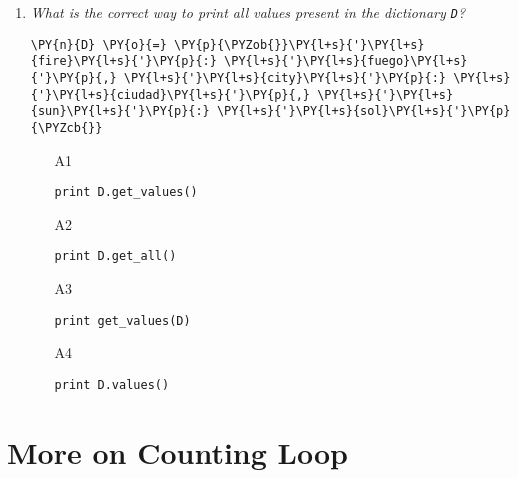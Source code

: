\begin{enumerate}
\vspace{6mm}

\item {\em What is the correct way to print 
all values present in the dictionary {\tt D}?}\\

\begin{Verbatim}[commandchars=\\\{\}]
\PY{n}{D} \PY{o}{=} \PY{p}{\PYZob{}}\PY{l+s}{'}\PY{l+s}{fire}\PY{l+s}{'}\PY{p}{:} \PY{l+s}{'}\PY{l+s}{fuego}\PY{l+s}{'}\PY{p}{,} \PY{l+s}{'}\PY{l+s}{city}\PY{l+s}{'}\PY{p}{:} \PY{l+s}{'}\PY{l+s}{ciudad}\PY{l+s}{'}\PY{p}{,} \PY{l+s}{'}\PY{l+s}{sun}\PY{l+s}{'}\PY{p}{:} \PY{l+s}{'}\PY{l+s}{sol}\PY{l+s}{'}\PY{p}{\PYZcb{}}
\end{Verbatim}
\vspace{6mm}

\begin{enumerate}
\item[A1] 
\begin{verbatim}
print D.get_values()
\end{verbatim}
\item[A2] 
\begin{verbatim}
print D.get_all()
\end{verbatim}
\item[A3] 
\begin{verbatim}
print get_values(D)
\end{verbatim}
\item[A4] 
\begin{verbatim}
print D.values()
\end{verbatim}
\end{enumerate}

\vspace{6mm}

\end{enumerate}


\section{More on Counting Loop} 

